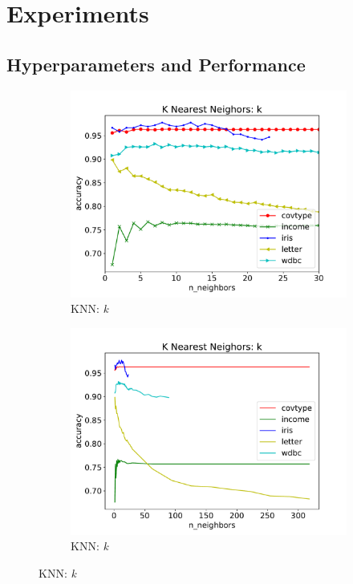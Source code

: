 \documentclass[twoside,11pt]{article}
\begin{document}
	\section{Experiments}
		
		\subsection{Hyperparameters and Performance}
			\begin{figure}[h]
				\centering
				
				\begin{subfigure}[b]{.45\linewidth}
					\includegraphics[width=\linewidth]{knn_hyperparam_zoomed}
					\caption{KNN: \textit{k}}
					\label{fig:hyperparam_knn_zoomed}
				\end{subfigure}
				\begin{subfigure}[b]{.45\linewidth}
					\includegraphics[width=\linewidth]{knn_hyperparam_all}
					\caption{KNN: \textit{k}}
					\label{fig:hyperparam_knn_all}
				\end{subfigure}
			

\end{figure}
\end{document}
